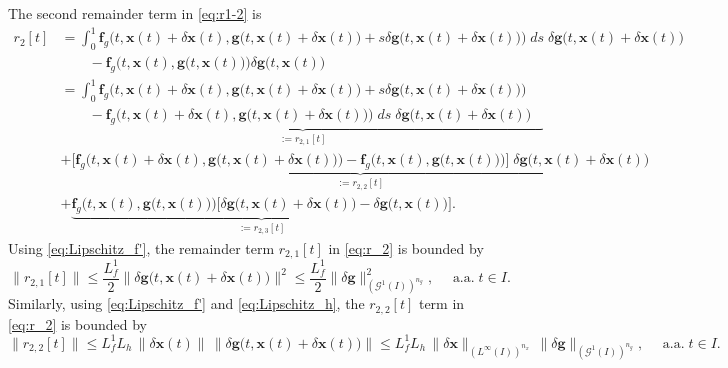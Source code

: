 \documentclass[onefignum,onetabnum]{siamart220329}
\numberwithin{equation}{section}
\newcommand{\aall}{\mbox{ a.a.} \;}
\newcommand{\bff}{\ensuremath{\mathbf{f}}} %
\newcommand{\bg}{\ensuremath{\mathbf{g}}} %
\newcommand{\bx}{\ensuremath{\mathbf{x}}} %
\newcommand {\cG} {\mathcal{G}}
\begin{document}
\begin{appendix}
   The second remainder term in \cref{eq:r1-2} is
    \begin{align}  \label{eq:r_2}
       r_2[t] 
        &= \int_0^1 \bff_g\Big( t, \bx(t) + \delta \bx(t), \bg\big( t,  \bx(t) + \delta \bx(t) \big) + s \delta \bg\big( t,   \bx(t) + \delta \bx(t) \big) \Big)  \; ds  
               \; \delta \bg \big(  t,  \bx(t) + \delta \bx(t) \big)  \nonumber \\
         & \qquad -  \bff_g\Big( t, \bx(t), \bg\big( t,   \bx(t) \big) \Big) \delta \bg \big(  t,  \bx(t) \big)  \nonumber \\
         &= \int_0^1  \bff_g\Big( t, \bx(t) + \delta \bx(t), \bg\big(  t,  \bx(t) + \delta \bx(t) \big) + s \delta \bg\big(  t,   \bx(t) + \delta \bx(t) \big) \Big)   \nonumber \\
           &\underbrace{ \qquad      - \bff_g\Big( t, \bx(t) + \delta \bx(t), \bg\big(  t,  \bx(t) + \delta \bx(t) \big) \Big)     \; ds   \; \delta \bg \big(  t,  \bx(t) + \delta \bx(t) \big) \quad }_{ := r_{2, 1}[t]  } \nonumber \\
         &   + \underbrace{\Big[  \bff_g\Big( t, \bx(t) + \delta \bx(t), \bg\big( t,   \bx(t) + \delta \bx(t) \big) \Big)
                      - \bff_g \Big(t, \bx(t), \bg\big(  t,  \bx(t) \big) \Big) \Big] \; \delta \bg \big( t,  \bx(t) + \delta \bx(t) \big)}_{:=r_{2, 2}[t]}    \nonumber \\
          &  + \underbrace{\bff_g \Big(t, \bx(t), \bg\big(  t,  \bx(t) \big) \Big) \Big[ \delta \bg
                                          \big( t,   \bx(t) + \delta \bx(t) \big) -  \delta \bg \big(  t,   \bx(t) \big) \Big]}_{:=r_{2, 3}[t]}.
     \end{align}
     Using \cref{eq:Lipschitz_f'}, the remainder term $r_{2,1}[t]$ in \cref{eq:r_2} is bounded by
     \begin{equation} \label{eq:r_21_bound}
     	\big\|   r_{2,1}[t]   \big\| \leq \frac{L_f^1}{2} \big\| \delta \bg\big( t,  \bx(t) + \delta \bx(t)\big) \big\|^2 
	                                      \leq \frac{L_f^1}{2} \| \delta \bg \|_{(\cG^1(I))^{n_g}}^2, \quad \aall t \in I.
	\end{equation}
     Similarly, using \cref{eq:Lipschitz_f'} and \cref{eq:Lipschitz_h}, the $r_{2, 2}[t]$ term in \cref{eq:r_2} is bounded by
     \begin{equation}  \label{eq:r_22_bound}
     	\big\| r_{2, 2}[t] \big\| \leq L_f^1 L_h \, \| \delta \bx(t) \| \, \big\| \delta \bg\big(  t,  \bx(t) + \delta \bx(t) \big) \big\| 
	        \leq L_f^1 L_h \, \| \delta \bx \|_{(L^\infty(I))^{n_x}}\, \| \delta \bg \|_{(\cG^1(I))^{n_g}}, \quad \aall t \in I.

\end{equation}
\end{appendix}
\end{document}
